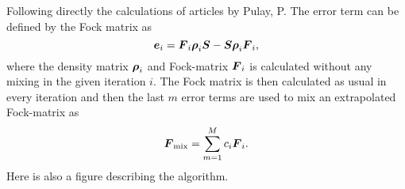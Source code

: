     Following directly the calculations of articles \cite{PULAY,PULAY2} by
    Pulay, P. The error term can be defined by the Fock matrix as
        \begin{equation}
            \boldsymbol{{e}}_i = \boldsymbol{{F}}_i\boldsymbol{{\rho}}_i\boldsymbol{{S}} -
            \boldsymbol{{S}}\boldsymbol{{\rho}}_i\boldsymbol{{F}}_i,
        \end{equation}
    where the density matrix $\boldsymbol{{\rho}}_i$ and Fock-matrix $\boldsymbol{{F}}_i$ is
    calculated without any mixing in the given iteration $i$. The Fock matrix
    is then calculated as usual in every iteration and then the last $m$ error
    terms are used to mix an extrapolated Fock-matrix as
        \begin{equation}
            \blds{F}_{\text{mix}} = \suml{m=1}{M}c_i\blds{F}_i.
            \label{eq:extrapolF}
        \end{equation}
    Here is also a figure describing the algorithm.
